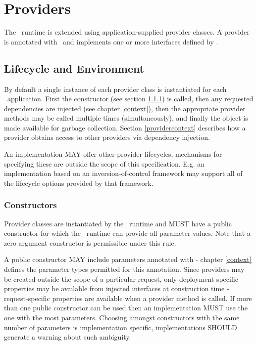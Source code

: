 \chapter{Providers}
\label{providers}

The \jaxrs\ runtime is extended using application-supplied provider classes. A provider is annotated with \Provider\ and implements one or more interfaces defined by \jaxrs.

\section{Lifecycle and Environment}
\label{lifecycle_and_environment}

By default a single instance of each provider class is instantiated for each \jaxrs\ application. First the constructor (see section \ref{provider_class_constructor}) is called, then any requested dependencies are injected (see chapter \ref{context}), then the appropriate provider methods may be called multiple times (simultaneously), and finally the object is made available for garbage collection. Section \ref{providercontext} describes how a provider obtains access to other providers via dependency injection.

An implementation MAY offer other provider lifecycles, mechanisms for specifying these are outside the scope of this specification. E.g. an implementation based on an inversion-of-control framework may support all of the lifecycle options provided by that framework.

\subsection{Constructors}
\label{provider_class_constructor}

Provider classes are instantiated by the \jaxrs\ runtime and MUST have a public constructor for which the \jaxrs\ runtime can provide all parameter values. Note that a zero argument constructor is permissible under this rule.

A public constructor MAY include parameters annotated with \Context - chapter \ref{context} defines the parameter types permitted for this annotation. Since providers may be created outside the scope of a particular request, only deployment-specific properties may be available from injected interfaces at construction time - request-specific properties are available when a provider method is called. If more than one public constructor can be used then an implementation MUST use the one with the most parameters. Choosing amongst constructors with the same number of parameters is implementation specific, implementations SHOULD generate a warning about such ambiguity.

